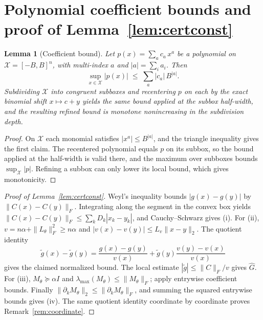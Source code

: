 \documentclass[12pt,onecolumn,journal]{IEEEtran}
\newtheorem{lemma}{Lemma}
\newcommand{\X}{\mathcal{X}}
\begin{document}
\appendices
\section{Polynomial coefficient bounds and proof of Lemma~\ref{lem:certconst}}
\label{app:coeff}
\begin{lemma}[Coefficient bound]
\label{lem:coeff}
Let $p(x) = \sum_{a} c_a\, x^a$ be a polynomial on $\X = [-B, B]^n$, with multi-index $a$ and $|a| = \sum_i a_i$. Then
\[
\sup_{x \in \X} |p(x)| \;\le\; \sum_{a} |c_a|\, B^{|a|} .
\]
Subdividing $\X$ into congruent subboxes and recentering $p$ on each by the exact binomial shift $x \mapsto c + y$ yields the same bound applied at the subbox half-width, and the resulting refined bound is monotone nonincreasing in the subdivision depth.
\end{lemma}

\begin{proof}
On $\X$ each monomial satisfies $|x^a| \le B^{|a|}$, and the triangle inequality gives the first claim. The recentered polynomial equals $p$ on its subbox, so the bound applied at the half-width is valid there, and the maximum over subboxes bounds $\sup_\X |p|$. Refining a subbox can only lower its local bound, which gives monotonicity.
\end{proof}



\begin{proof}[Proof of Lemma~\ref{lem:certconst}]
Weyl's inequality bounds $|g(x)-g(y)|$ by $\|C(x)-C(y)\|_F$. Integrating along the segment in the convex box yields $\|C(x)-C(y)\|_F\le\sum_kD_k|x_k-y_k|$, and Cauchy--Schwarz gives (i). For (ii), $v=n\alpha+\|L_\theta\|_F^2\ge n\alpha$ and $|v(x)-v(y)|\le L_v\|x-y\|_2$. The quotient identity
\[
\tilde g(x)-\tilde g(y)=\frac{g(x)-g(y)}{v(x)}+\tilde g(y)\frac{v(y)-v(x)}{v(x)}
\]
gives the claimed normalized bound. The local estimate $|\tilde g|\le\|C\|_F/v$ gives $\widehat G$. For (iii), $M_\theta\succeq\alpha I$ and $\lambda_{\max}(M_\theta)\le\|M_\theta\|_F$; apply entrywise coefficient bounds. Finally $\|\partial_k M_\theta\|_2\le\|\partial_k M_\theta\|_F$, and summing the squared entrywise bounds gives (iv). The same quotient identity coordinate by coordinate proves Remark~\ref{rem:coordinate}.
\end{proof}
\end{document}
